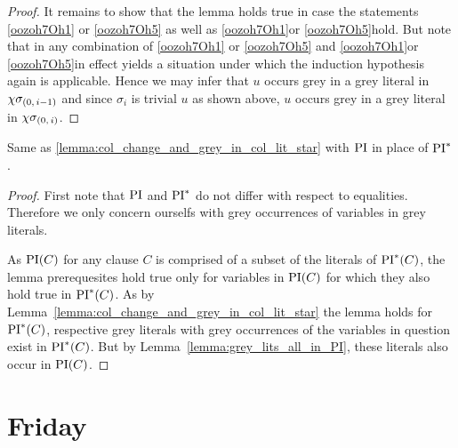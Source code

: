 \documentclass[,%
	draft=false,%
	numbers=noendperiod
	12pt,
	a4paper,
	oneside,%
	openany,
]{memoir}
\newcommand{\inv}{\ensuremath{\chi}}
\begin{document}
\begin{proof}
	It remains to show that the lemma holds true in case the statements \ref{oozoh7Oh1} or \ref{oozoh7Oh5} as well as \ref{oozoh7Oh1}\othercase or \ref{oozoh7Oh5}\othercase hold.
	But note that in any combination of \ref{oozoh7Oh1} or \ref{oozoh7Oh5} and \ref{oozoh7Oh1}\othercase or \ref{oozoh7Oh5}\othercase in effect yields a situation under which the induction hypothesis again is applicable.
	Hence we may infer that $u$ occurs grey in a grey literal in $\inv\sigmazmi$ and since $\sigma_i$ is trivial $u$ as shown above, $u$ occurs grey in a grey literal in $\inv\sigmazi$.
\end{proof}

\begin{lemma}
	\label{lemma:col_change_and_grey_in_col_lit}
	Same as \ref{lemma:col_change_and_grey_in_col_lit_star} with $\operatorname{PI}$ in place of $\operatorname{PI}^*$.
\end{lemma}
\begin{proof}
	First note that $\operatorname{PI}$ and $\operatorname{PI}^*$ do not differ with respect to equalities. Therefore we only concern ourselfs with grey occurrences of variables in grey literals.

	As $\operatorname{PI}(C)$ for any clause $C$ is comprised of a subset of the literals of $\operatorname{PI}^*(C)$, the lemma prerequesites hold true only for variables in $\operatorname{PI}(C)$ for which they also hold true in $\operatorname{PI}^*(C)$.
	As by Lemma~\ref{lemma:col_change_and_grey_in_col_lit_star} the lemma holds for $\operatorname{PI}^*(C)$, respective grey literals with grey occurrences of the variables in question exist in $\operatorname{PI}^*(C)$.
	But by Lemma~\ref{lemma:grey_lits_all_in_PI}, these literals also occur in $\operatorname{PI}(C)$.
\end{proof}


\section{Friday}
\end{document}
